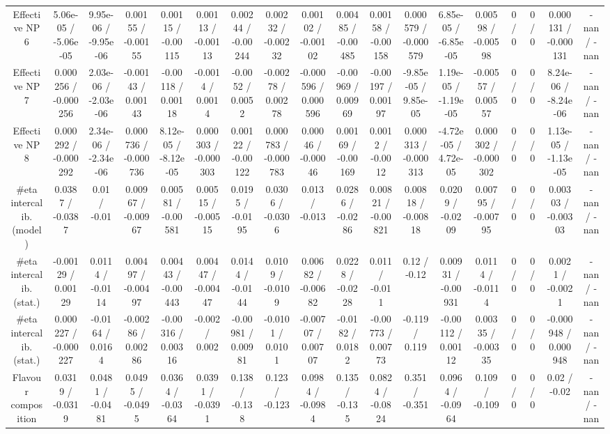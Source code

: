 \documentclass[10pt]{article}
\begin{document}
\begin{table}[htbp]
\begin{center}
\begin{tabular}{|c|c|c|c|c|c|c|c|c|c|c|c|c|c|c|c|c|c|}
  Effective NP 6 & 5.06e-05 / -5.06e-05 & 9.95e-06 / -9.95e-06 & 0.00155 / -0.00155 & 0.00115 / -0.00115 & 0.00113 / -0.00113 & 0.00244 / -0.00244 & 0.00232 / -0.00232 & 0.00102 / -0.00102 & 0.00485 / -0.00485 & 0.00158 / -0.00158 & 0.000579 / -0.000579 & 6.85e-05 / -6.85e-05 & 0.00598 / -0.00598 & 0 / 0 & 0 / 0 & 0.000131 / -0.000131 & -nan / -nan \\ 
  Effective NP 7 & 0.000256 / -0.000256 & 2.03e-06 / -2.03e-06 & -0.00143 / 0.00143 & -0.00118 / 0.00118 & -0.0014 / 0.0014 & -0.0052 / 0.0052 & -0.00278 / 0.00278 & -0.000596 / 0.000596 & -0.00969 / 0.00969 & -0.00197 / 0.00197 & -9.85e-05 / 9.85e-05 & 1.19e-05 / -1.19e-05 & -0.00557 / 0.00557 & 0 / 0 & 0 / 0 & 8.24e-06 / -8.24e-06 & -nan / -nan \\ 
  Effective NP 8 & 0.000292 / -0.000292 & 2.34e-06 / -2.34e-06 & 0.000736 / -0.000736 & 8.12e-05 / -8.12e-05 & 0.000303 / -0.000303 & 0.00122 / -0.00122 & 0.000783 / -0.000783 & 0.00046 / -0.00046 & 0.00169 / -0.00169 & 0.0012 / -0.0012 & 0.000313 / -0.000313 & -4.72e-05 / 4.72e-05 & 0.000302 / -0.000302 & 0 / 0 & 0 / 0 & 1.13e-05 / -1.13e-05 & -nan / -nan \\ 
  #eta intercalib. (model) & 0.0387 / -0.0387 & 0.01 / -0.01 & 0.00967 / -0.00967 & 0.00581 / -0.00581 & 0.00515 / -0.00515 & 0.0195 / -0.0195 & 0.0306 / -0.0306 & 0.013 / -0.013 & 0.0286 / -0.0286 & 0.00821 / -0.00821 & 0.00818 / -0.00818 & 0.0209 / -0.0209 & 0.00795 / -0.00795 & 0 / 0 & 0 / 0 & 0.00303 / -0.00303 & -nan / -nan \\ 
  #eta intercalib. (stat.) & -0.00129 / 0.00129 & 0.0114 / -0.0114 & 0.00497 / -0.00497 & 0.00443 / -0.00443 & 0.00447 / -0.00447 & 0.0144 / -0.0144 & 0.0109 / -0.0109 & 0.00682 / -0.00682 & 0.0228 / -0.0228 & 0.011 / -0.011 & 0.12 / -0.12 & 0.00931 / -0.00931 & 0.0114 / -0.0114 & 0 / 0 & 0 / 0 & 0.0021 / -0.0021 & -nan / -nan \\ 
  #eta intercalib. (stat.) & 0.000227 / -0.000227 & -0.0164 / 0.0164 & -0.00286 / 0.00286 & -0.00316 / 0.00316 & -0.002 / 0.002 & -0.00981 / 0.00981 & -0.0101 / 0.0101 & -0.00707 / 0.00707 & -0.0182 / 0.0182 & -0.00773 / 0.00773 & -0.119 / 0.119 & -0.00112 / 0.00112 & 0.00335 / -0.00335 & 0 / 0 & 0 / 0 & -0.000948 / 0.000948 & -nan / -nan \\ 
  Flavour composition & 0.0319 / -0.0319 & 0.0481 / -0.0481 & 0.0495 / -0.0495 & 0.0364 / -0.0364 & 0.0391 / -0.0391 & 0.138 / -0.138 & 0.123 / -0.123 & 0.0984 / -0.0984 & 0.135 / -0.135 & 0.0824 / -0.0824 & 0.351 / -0.351 & 0.0964 / -0.0964 & 0.109 / -0.109 & 0 / 0 & 0 / 0 & 0.02 / -0.02 & -nan / -nan \\ 

\end{tabular}
\end{center}
\end{table}
\end{document}
